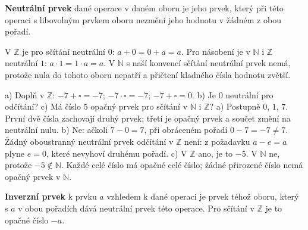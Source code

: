 \documentclass[11pt,a4paper]{article}
\begin{document}
\begin{definiceBox}[title={Definice - Neutrální prvek}]
\textbf{Neutrální prvek} dané operace v daném oboru je jeho prvek,
který při této operaci s libovolným prvkem oboru nezmění jeho hodnotu
v žádném z obou pořadí.
\end{definiceBox}

V $\mathbb Z$ je pro sčítání neutrální $0$: $a+0=0+a=a$.
Pro násobení je v $\mathbb N$ i $\mathbb Z$ neutrální $1$: $a\cdot1=1\cdot a=a$.
V $\mathbb N$ s naší konvencí sčítání neutrální prvek nemá,
protože nula do tohoto oboru nepatří a přičtení kladného čísla hodnotu zvětší.

\begin{prikladReseniBox}[title={Příklad 3},breakable=false]
a) Doplň v $\mathbb Z$: $-7+\square=-7$; $-7\cdot\square=-7$;
$-7+\square=0$. b) Je $0$ neutrální pro odčítání?
c) Má číslo $5$ opačný prvek pro sčítání v $\mathbb N$ i $\mathbb Z$?
\tcblower
a) Postupně $0$, $1$, $7$. První dvě čísla zachovají druhý prvek;
třetí je opačný prvek a součet změní na neutrální nulu.
b) Ne: ačkoli $7-0=7$, při obráceném pořadí $0-7=-7\ne7$.
Žádný oboustranný neutrální prvek odčítání v $\mathbb Z$ není:
z požadavku $a-e=a$ plyne $e=0$, které nevyhoví druhému pořadí.
c) V $\mathbb Z$ ano, je to $-5$. V $\mathbb N$ ne, protože $-5\notin\mathbb N$.
Každé celé číslo má opačné celé číslo; žádné přirozené číslo nemá opačný prvek v $\mathbb N$.
\end{prikladReseniBox}


\begin{definiceBox}[title={Definice - Inverzní prvek}]
\textbf{Inverzní prvek} k prvku $a$ vzhledem k dané operaci
je prvek téhož oboru, který s $a$ v obou pořadích dává neutrální prvek
této operace. Pro sčítání v $\mathbb Z$ je to opačné číslo $-a$.
\end{definiceBox}
\end{document}
